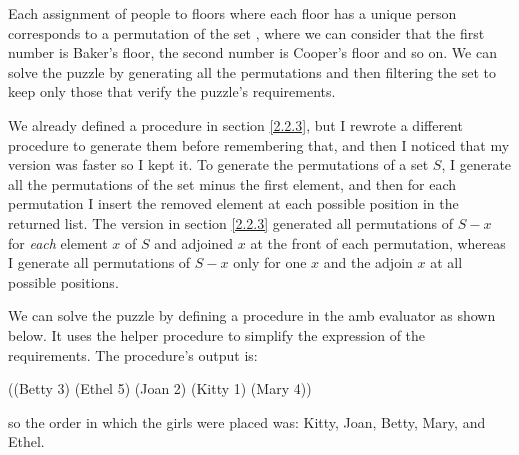 \begin{exe}[4.41]
    Each assignment of people to floors where each floor has a unique person 
    corresponds to a permutation of the set , where we can 
    consider that the first number is Baker’s floor, the second number is 
    Cooper’s floor and so on. We can solve the puzzle by generating all the 
    permutations and then filtering the set to keep only those that verify the 
    puzzle’s requirements.

    We already defined a  procedure in section \ref{2.2.3}, 
    but I rewrote a different procedure to generate them before remembering 
    that, and then I noticed that my version was faster so I kept it. To 
    generate the permutations of a set $S$, I generate all the permutations of 
    the set minus the first element, and then for each permutation I insert the 
    removed element at each possible position in the returned list. The version 
    in section \ref{2.2.3} generated all permutations of $S - x$ for \emph{each} 
    element $x$ of $S$ and adjoined $x$ at the front of each permutation, 
    whereas I generate all permutations of $S - x$ only for one $x$ and the 
    adjoin $x$ at all possible positions.
\end{exe}

\begin{exe}[4.42]
    We can solve the puzzle by defining a  procedure in the amb 
    evaluator as shown below. It uses the helper procedure  to 
    simplify the expression of the requirements.
    The procedure’s output is:
    \begin{cscm}
        ((Betty 3) (Ethel 5) (Joan 2) (Kitty 1) (Mary 4))
    \end{cscm}
    so the order in which the girls were placed was: Kitty, Joan, Betty, Mary, 
    and Ethel.
\end{exe}

